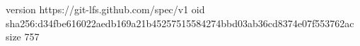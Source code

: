 version https://git-lfs.github.com/spec/v1
oid sha256:d34fbe616022aedb169a21b45257515584274bbd03ab36cd8374e07f553762ac
size 757
